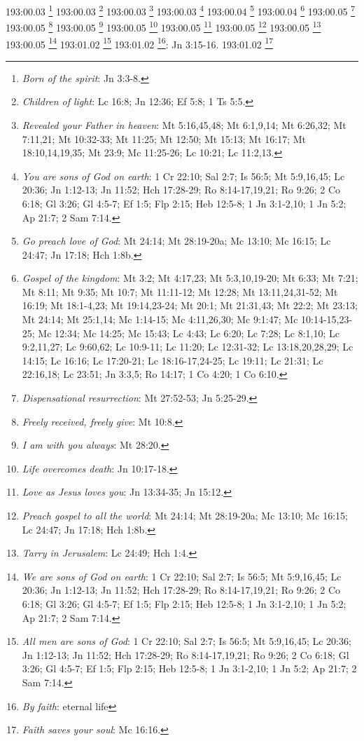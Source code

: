 {{{{{{{{{{{{{{{{{{{{{{{{{{{{{{{{{{{{{{{{{{{{{{{{{{{{{{{{{{{{{{{{{{{{{{{{{{{{{{{{{{{{{{{{{{{{{{{193:00.03 \footnote{\textit{Born of the spirit}: Jn 3:3-8.}
193:00.03 \footnote{\textit{Children of light}: Lc 16:8; Jn 12:36; Ef 5:8; 1 Ts 5:5.}
193:00.03 \footnote{\textit{Revealed your Father in heaven}: Mt 5:16,45,48; Mt 6:1,9,14; Mt 6:26,32; Mt 7:11,21; Mt 10:32-33; Mt 11:25; Mt 12:50; Mt 15:13; Mt 16:17; Mt 18:10,14,19,35; Mt 23:9; Mc 11:25-26; Lc 10:21; Lc 11:2,13.}
193:00.03 \footnote{\textit{You are sons of God on earth}: 1 Cr 22:10; Sal 2:7; Is 56:5; Mt 5:9,16,45; Lc 20:36; Jn 1:12-13; Jn 11:52; Hch 17:28-29; Ro 8:14-17,19,21; Ro 9:26; 2 Co 6:18; Gl 3:26; Gl 4:5-7; Ef 1:5; Flp 2:15; Heb 12:5-8; 1 Jn 3:1-2,10; 1 Jn 5:2; Ap 21:7; 2 Sam 7:14.}
193:00.04 \footnote{\textit{Go preach love of God}: Mt 24:14; Mt 28:19-20a; Mc 13:10; Mc 16:15; Lc 24:47; Jn 17:18; Hch 1:8b.}
193:00.04 \footnote{\textit{Gospel of the kingdom}: Mt 3:2; Mt 4:17,23; Mt 5:3,10,19-20; Mt 6:33; Mt 7:21; Mt 8:11; Mt 9:35; Mt 10:7; Mt 11:11-12; Mt 12:28; Mt 13:11,24,31-52; Mt 16:19; Mt 18:1-4,23; Mt 19:14,23-24; Mt 20:1; Mt 21:31,43; Mt 22:2; Mt 23:13; Mt 24:14; Mt 25:1,14; Mc 1:14-15; Mc 4:11,26,30; Mc 9:1:47; Mc 10:14-15,23-25; Mc 12:34; Mc 14:25; Mc 15:43; Lc 4:43; Lc 6:20; Lc 7:28; Lc 8:1,10; Lc 9:2,11,27; Lc 9:60,62; Lc 10:9-11; Lc 11:20; Lc 12:31-32; Lc 13:18,20,28,29; Lc 14:15; Lc 16:16; Lc 17:20-21; Lc 18:16-17,24-25; Lc 19:11; Lc 21:31; Lc 22:16,18; Lc 23:51; Jn 3:3,5; Ro 14:17; 1 Co 4:20; 1 Co 6:10.}
193:00.05 \footnote{\textit{Dispensational resurrection}: Mt 27:52-53; Jn 5:25-29.}
193:00.05 \footnote{\textit{Freely received, freely give}: Mt 10:8.}
193:00.05 \footnote{\textit{I am with you always}: Mt 28:20.}
193:00.05 \footnote{\textit{Life overcomes death}: Jn 10:17-18.}
193:00.05 \footnote{\textit{Love as Jesus loves you}: Jn 13:34-35; Jn 15:12.}
193:00.05 \footnote{\textit{Preach gospel to all the world}: Mt 24:14; Mt 28:19-20a; Mc 13:10; Mc 16:15; Lc 24:47; Jn 17:18; Hch 1:8b.}
193:00.05 \footnote{\textit{Tarry in Jerusalem}: Lc 24:49; Hch 1:4.}
193:00.05 \footnote{\textit{We are sons of God on earth}: 1 Cr 22:10; Sal 2:7; Is 56:5; Mt 5:9,16,45; Lc 20:36; Jn 1:12-13; Jn 11:52; Hch 17:28-29; Ro 8:14-17,19,21; Ro 9:26; 2 Co 6:18; Gl 3:26; Gl 4:5-7; Ef 1:5; Flp 2:15; Heb 12:5-8; 1 Jn 3:1-2,10; 1 Jn 5:2; Ap 21:7; 2 Sam 7:14.}
193:01.02 \footnote{\textit{All men are sons of God}: 1 Cr 22:10; Sal 2:7; Is 56:5; Mt 5:9,16,45; Lc 20:36; Jn 1:12-13; Jn 11:52; Hch 17:28-29; Ro 8:14-17,19,21; Ro 9:26; 2 Co 6:18; Gl 3:26; Gl 4:5-7; Ef 1:5; Flp 2:15; Heb 12:5-8; 1 Jn 3:1-2,10; 1 Jn 5:2; Ap 21:7; 2 Sam 7:14.}
193:01.02 \footnote{\textit{By faith}: eternal life}: Jn 3:15-16.}
193:01.02 \footnote{\textit{Faith saves your soul}: Mc 16:16.}
}}}}}}}}}}}}}}}}}}}}}}}}}}}}}}}}}}}}}}}}}}}}}}}}}}}}}}}}}}}}}}}}}}}}}}}}}}}}}}}}}}}}}}}}}}}}}}
